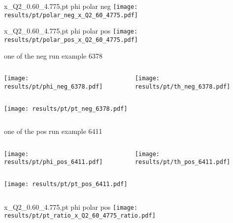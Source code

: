 \begin{frame}{x\_Q2\_0.60\_4.775,pt phi polar neg}
\texttt{[image: results/pt/polar\_neg\_x\_Q2\_60\_4775.pdf]}
\end{frame}
\begin{frame}{x\_Q2\_0.60\_4.775,pt phi polar pos}
\texttt{[image: results/pt/polar\_pos\_x\_Q2\_60\_4775.pdf]}
\end{frame}
\begin{frame}{one of the neg run example 6378}
\begin{columns}
\begin{column}[T]{0.5\textwidth}
\texttt{[image: results/pt/phi\_neg\_6378.pdf]}
\end{column}
\begin{column}[T]{0.5\textwidth}
\texttt{[image: results/pt/th\_neg\_6378.pdf]}
\end{column}
\end{columns}
\begin{columns}
\begin{column}[T]{0.5\textwidth}
\texttt{[image: results/pt/pt\_neg\_6378.pdf]}
\end{column}
\begin{column}[T]{0.5\textwidth}
\end{column}
\end{columns}
\end{frame}
\begin{frame}{one of the pos run example 6411}
\begin{columns}
\begin{column}[T]{0.5\textwidth}
\texttt{[image: results/pt/phi\_pos\_6411.pdf]}
\end{column}
\begin{column}[T]{0.5\textwidth}
\texttt{[image: results/pt/th\_pos\_6411.pdf]}
\end{column}
\end{columns}
\begin{columns}
\begin{column}[T]{0.5\textwidth}
\texttt{[image: results/pt/pt\_pos\_6411.pdf]}
\end{column}
\begin{column}[T]{0.5\textwidth}
\end{column}
\end{columns}
\end{frame}
\begin{frame}{x\_Q2\_0.60\_4.775,pt phi polar pos}
\texttt{[image: results/pt/pt\_ratio\_x\_Q2\_60\_4775\_ratio.pdf]}
\end{frame}
